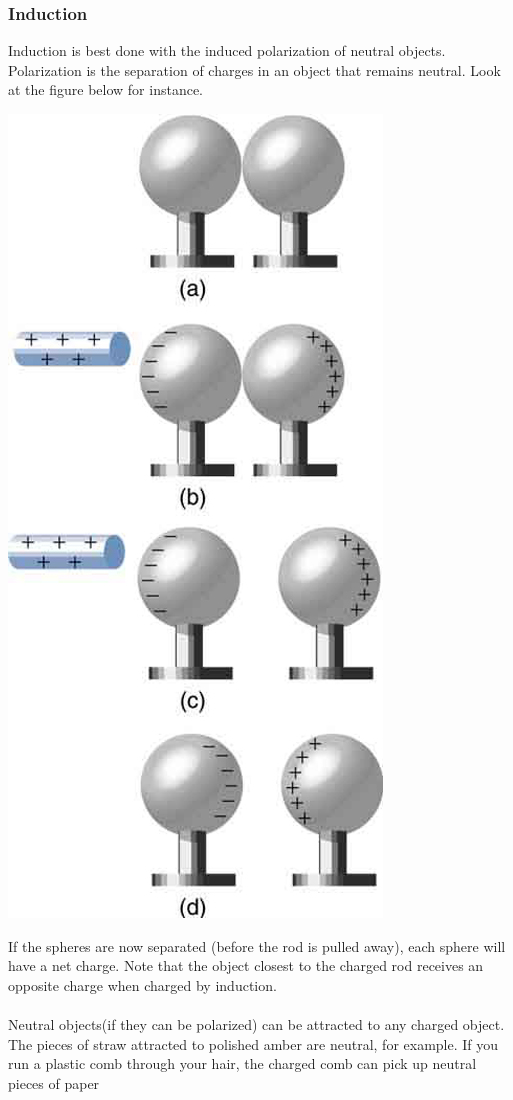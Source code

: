\documentclass[9pt]{exam}
\begin{document}
	\subsubsection*{Induction}	 
	Induction is best done with the induced polarization of neutral objects. Polarization is the separation of charges in an object that remains neutral. Look at the figure below for instance.
	\begin{center}
		\includegraphics[scale=0.4]{induction}
	\end{center}If the spheres are now separated (before the rod is pulled away), each sphere will have a net charge. Note that the object closest to the charged rod receives an opposite charge when charged by induction. \\ \\
	Neutral objects(if they can be polarized) can be attracted to any charged object. The pieces of straw attracted to polished amber are neutral, for example. If you run a plastic comb through your hair, the charged comb can pick up neutral pieces of paper
\end{document}
